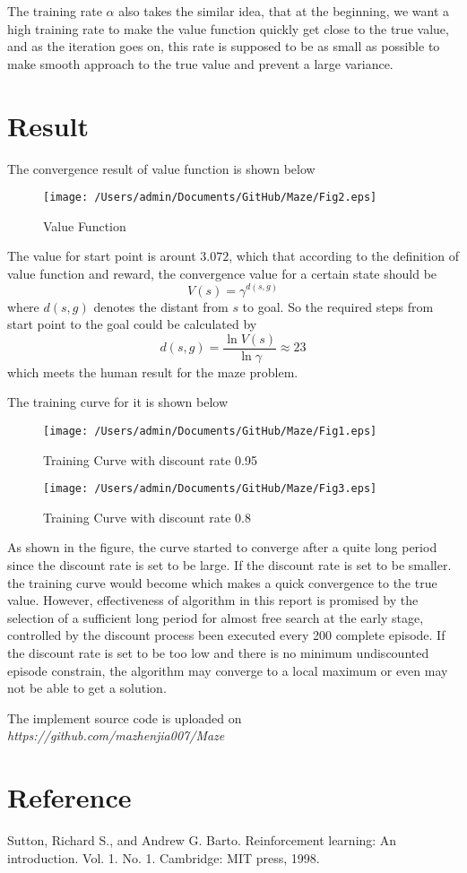 \documentclass{article}
\begin{document}
		The training rate $\alpha$ also takes the similar idea, that at the beginning, we want
		a high training rate to make the value function quickly get close to the true value,
		and as the iteration goes on, this rate is supposed to be as small as possible
		to make smooth approach to the true value and prevent a large variance.
		
	\section{Result}
		The convergence result of value function is shown below
		\begin{figure}[ht]
			\center
			\texttt{[image: /Users/admin/Documents/GitHub/Maze/Fig2.eps]}
			\caption{Value Function}
		\end{figure}
		The value for start point is arount $3.072$, which that according to the definition of 
		value function and reward, the convergence value for a certain state should be 
		\[
			V(s) = \gamma^{d(s, g)}
		\]
		where $d(s, g)$ denotes the distant from $s$ to goal. So the required steps from 
		start point to the goal could be calculated by
		\[
			d(s, g) = \frac{\ln V(s)}{\ln \gamma} \approx 23
		\]
		which meets the human result for the maze problem.
		
		The training curve for it is shown below
		\begin{figure}[ht]
			\center
			\texttt{[image: /Users/admin/Documents/GitHub/Maze/Fig1.eps]}
			\caption{Training Curve with discount rate 0.95}
			\texttt{[image: /Users/admin/Documents/GitHub/Maze/Fig3.eps]}
			\caption{Training Curve with discount rate 0.8}
		\end{figure}
		
		As shown in the figure, the curve started to converge after a quite long period since
		the discount rate is set to be large. If the discount rate is set to be smaller.
		the training curve would become
		which makes a quick convergence to the true value.
		However, effectiveness of algorithm in this report is promised by the selection of
		a sufficient long period for almost free search at the early stage, controlled by 
		the discount process been executed every 200 complete episode.
		If the discount rate is set to be too low and there is no minimum undiscounted 
		episode constrain, the algorithm may converge to a local maximum or even
		may not be able to get a solution.
		
		The implement source code is uploaded on 
		\textit{https://github.com/mazhenjia007/Maze}
	\section{Reference}
		Sutton, Richard S., and Andrew G. Barto. Reinforcement learning: An introduction. Vol. 1. No. 1. Cambridge: MIT press, 1998.
\end{document}

